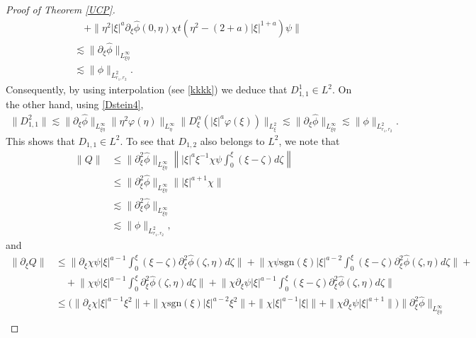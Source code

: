 \documentclass[reqno]{amsart}
\newcommand{\ha}{\hat{\phi}}
\newcommand{\les}{\lesssim}
\newcommand{\La}{\|\phi\|_{L^2_{r_1,r_2}}}
\newcommand{\dt}{D^{\alpha}_\xi}
\newcommand{\p}{\partial}
\newcommand{\sgn}{\text{sgn}}
\numberwithin{equation}{section}
\begin{document}
\begin{proof}[Proof of Theorem \ref{UCP}]
\begin{equation*}
\begin{split}
&\quad +\|\eta^2 |\xi|^a \p_\xi \ha(0,\eta)\chi t(\eta^2-(2+a)|\xi|^{1+a})\psi\|\\
&\lesssim \|\p_\xi \ha\|_{L^\infty_{\xi\eta}}\\
&\les \La.
\end{split}
\end{equation*}
Consequently, by using interpolation (see \eqref{kkkk}) we deduce that $D_{1,1}^1\in L^2$. On  the other hand, using \eqref{Dstein4},
\begin{equation*}
\begin{split}
\|D_{1,1}^2\|\lesssim \|\p_\xi \ha\|_{L^\infty_{\xi\eta}}\|\eta^2 \varphi(\eta)\|_{L^\infty_\eta}\|\dt (|\xi|^a \varphi(\xi))\|_{L^2_\xi}
\lesssim\|\p_\xi \ha\|_{L^\infty_{\xi\eta}}
\les \La.
\end{split}
\end{equation*}
This shows that $D_{1,1}\in L^2$. To see that $D_{1,2}$ also belongs to $L^2$, we note that
\begin{equation}
\begin{split}\label{N}
\|Q\|%
                            &\leq \|\partial_\xi^2 \hat{\phi}\|_{L^{\infty}_{\xi\eta}}\left\| |\xi|^a \xi^{-1}\chi\psi\int_0^\xi (\xi-\zeta)d\zeta\right \|\\
                            &\leq \|\partial_\xi^2 \hat{\phi}\|_{L^{\infty}_{\xi\eta}} \||\xi|^{a+1}\chi \|\\
                            &\lesssim  \|\partial_\xi^2 \hat{\phi}\|_{L^\infty_{\xi \eta}}\\
                            &\lesssim \La,
\end{split}
\end{equation}
and
\begin{equation}
\begin{split}\label{pN}
\|\partial_\xi Q\|&\leq \Big\| \partial_\xi \chi \psi|\xi|^{a-1}\int_0^\xi (\xi-\zeta)\partial_\xi^2 \hat{\phi}(\zeta,\eta)d\zeta \Big\|+
                     \Big\|\chi \psi \sgn(\xi) |\xi|^{a-2}\int_0^\xi (\xi-\zeta)\partial_\xi^2 \hat{\phi}(\zeta,\eta)d\zeta \Big\|+ \\
                    &\quad+\Big\|\chi \psi |\xi|^{a-1}\int_0^\xi \partial_\xi^2 \hat{\phi}(\zeta,\eta)d\zeta \Big\|+\Big\|  \chi \partial_\xi \psi|\xi|^{a-1}\int_0^\xi (\xi-\zeta)\partial_\xi^2 \hat{\phi}(\zeta,\eta)d\zeta \Big\|\\
                            &\leq \Big(\| \p_\xi\chi|\xi|^{a-1}\xi^2 \|+\|\chi \sgn(\xi)|\xi|^{a-2}\xi^2\|+\|\chi |\xi|^{a-1}|\xi|\|+\|\chi \p_\xi \psi |\xi|^{a+1}\|\Big)\|\partial_\xi^2 \hat{\phi}\|_{L^{\infty}_{\xi\eta}}\\

\end{split}
\end{equation}
\end{proof}
\end{document}
